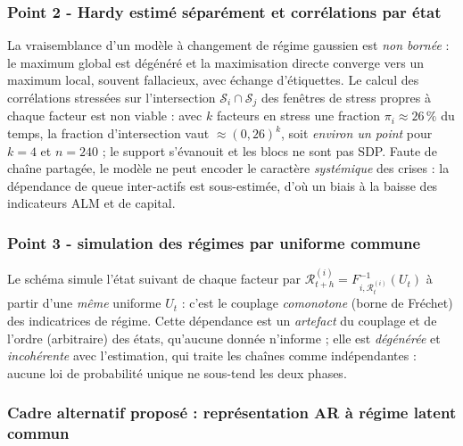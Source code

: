 \documentclass[11pt,a4paper]{article}
\begin{document}
\subsubsection{Point 2 - Hardy estimé séparément et corrélations par état}

La vraisemblance d'un modèle à changement de régime gaussien est \emph{non bornée} : le maximum global est dégénéré et la maximisation directe converge vers un maximum local, souvent fallacieux, avec échange d'étiquettes. Le calcul des corrélations stressées sur l'intersection $\mathcal{S}_i\cap\mathcal{S}_j$ des fenêtres de stress propres à chaque facteur est non viable : avec $k$ facteurs en stress une fraction $\pi_i\approx 26\,\%$ du temps, la fraction d'intersection vaut $\approx (0{,}26)^k$, soit \emph{environ un point} pour $k=4$ et $n=240$ ; le support s'évanouit et les blocs ne sont pas SDP. Faute de chaîne partagée, le modèle ne peut encoder le caractère \emph{systémique} des crises : la dépendance de queue inter-actifs est sous-estimée, d'où un biais à la baisse des indicateurs ALM et de capital.

\subsubsection{Point 3 - simulation des régimes par uniforme commune}

Le schéma simule l'état suivant de chaque facteur par $\mathcal{R}^{(i)}_{t+h}=F^{-1}_{i,\mathcal{R}^{(i)}_t}(U_t)$ à partir d'une \emph{même} uniforme $U_t$ : c'est le couplage \emph{comonotone} (borne de Fréchet) des indicatrices de régime. Cette dépendance est un \emph{artefact} du couplage et de l'ordre (arbitraire) des états, qu'aucune donnée n'informe ; elle est \emph{dégénérée} et \emph{incohérente} avec l'estimation, qui traite les chaînes comme indépendantes : aucune loi de probabilité unique ne sous-tend les deux phases.

\subsubsection{Cadre alternatif proposé : représentation AR à régime latent commun}
\end{document}
